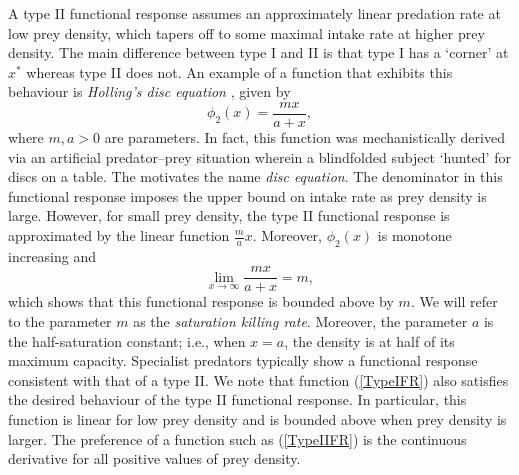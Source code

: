 \documentclass[12pt]{UOthesis}
\theoremstyle{remarkstyle}
\begin{document}
A type II functional response assumes an approximately linear predation rate at low prey density, which tapers off to some maximal intake rate at higher prey density. The main difference between type I and II is that type I has a `corner' at $x^*$ whereas type II does not. An example of a function that exhibits this behaviour is \textit{Holling's disc equation} \cite{Holling2}, given by
\begin{equation}
	\phi_{2}(x)=\frac{mx}{a+x},
	\label{TypeIIFR}
\end{equation}
where $m,a>0$ are parameters. In fact, this function was mechanistically derived via an artificial predator--prey situation wherein a blindfolded subject `hunted' for discs on a table. The motivates the name \textit{disc equation}. The denominator in this functional response imposes the upper bound on intake rate as prey density is large. However, for small prey density, the type II functional response is approximated by the linear function $\frac{m}{a}x$. Moreover, $\phi_{2}(x)$ is monotone increasing and
$$\lim_{x\rightarrow\infty}\frac{mx}{a+x}=m,$$
which shows that this functional response is bounded above by $m$. We will refer to the parameter $m$ as the \textit{saturation killing rate}. Moreover, the parameter $a$ is the half-saturation constant; i.e., when $x=a$, the density is at half of its maximum capacity. Specialist predators typically show a functional response consistent with that of a type II. We note that function (\ref{TypeIFR}) also satisfies the desired behaviour of the type II functional response. In particular, this function is linear for low prey density and is bounded above when prey density is larger. The preference of a function such as (\ref{TypeIIFR}) is the continuous derivative for all positive values of prey density.\\
\end{document}
